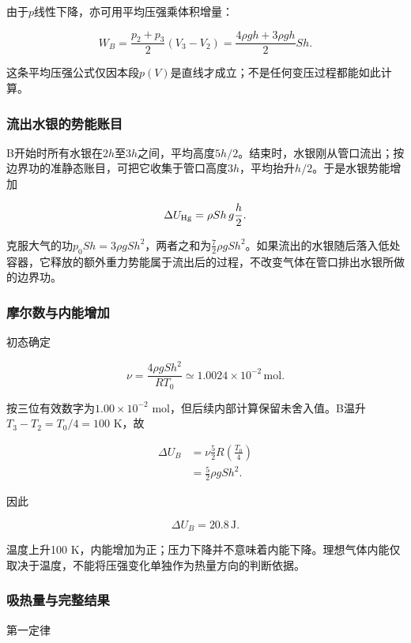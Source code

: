 \documentclass[12pt,a4paper,fontset=fandol]{ctexart}
\begin{document}
由于\(p\)线性下降，亦可用平均压强乘体积增量：

\[
W_B=\frac{p_2+p_3}{2}(V_3-V_2)
=\frac{4\rho gh+3\rho gh}{2}Sh.
\]

这条平均压强公式仅因本段\(p(V)\)是直线才成立；不是任何变压过程都能如此计算。

\subsubsection{流出水银的势能账目}\label{ux6d41ux51faux6c34ux94f6ux7684ux52bfux80fdux8d26ux76ee}

B开始时所有水银在\(2h\)至\(3h\)之间，平均高度\(5h/2\)。结束时，水银刚从管口流出；按边界功的准静态账目，可把它收集于管口高度\(3h\)，平均抬升\(h/2\)。于是水银势能增加

\[
\Delta U_{\rm Hg}=\rho Sh\,g\frac h2.
\]

克服大气的功\(p_0Sh=3\rho gSh^2\)，两者之和为\(\tfrac72\rho gSh^2\)。如果流出的水银随后落入低处容器，它释放的额外重力势能属于流出后的过程，不改变气体在管口排出水银所做的边界功。

\subsubsection{摩尔数与内能增加}\label{ux6469ux5c14ux6570ux4e0eux5185ux80fdux589eux52a0}

初态确定

\[
\nu=\frac{4\rho gSh^2}{RT_0}
\simeq1.0024\times10^{-2}\,\mathrm{mol}.
\]

按三位有效数字为\(1.00\times10^{-2}\)
mol，但后续内部计算保留未舍入值。B温升\(T_3-T_2=T_0/4=100\) K，故

\[
\begin{aligned}
\Delta U_B
&=\nu\frac52R\left(\frac{T_0}{4}\right)\\
&=\frac52\rho gSh^2.
\end{aligned}
\]

因此

\[
\boxed{\Delta U_B=20.8\,\mathrm J}.
\]

温度上升100
K，内能增加为正；压力下降并不意味着内能下降。理想气体内能仅取决于温度，不能将压强变化单独作为热量方向的判断依据。

\subsubsection{吸热量与完整结果}\label{ux5438ux70edux91cfux4e0eux5b8cux6574ux7ed3ux679c}

第一定律
\end{document}
